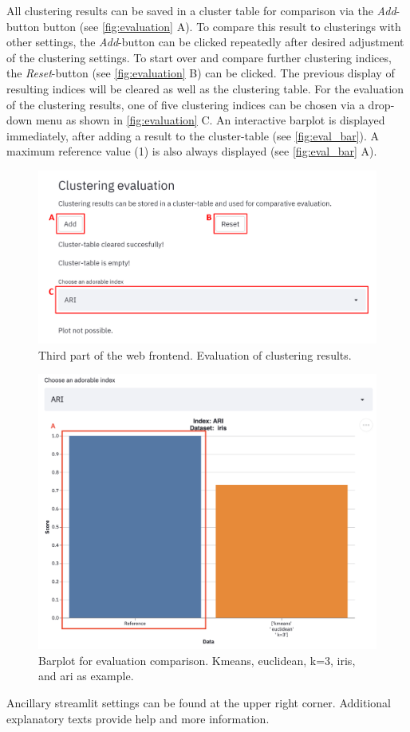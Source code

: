 All clustering results can be saved in a cluster table for comparison via the \textit{Add}-button button (see \autoref{fig:evaluation} A). To compare this result to clusterings with other settings, the \textit{Add}-button can be clicked repeatedly after desired adjustment of the clustering settings. To start over and compare further clustering indices, the \textit{Reset}-button (see \autoref{fig:evaluation} B) can be clicked. The previous display of resulting indices will be cleared as well as the clustering table.
For the evaluation of the clustering results, one of five clustering indices can be chosen via a drop-down menu as shown in \autoref{fig:evaluation} C. An interactive barplot is displayed immediately, after adding a result to the cluster-table (see \autoref{fig:eval_bar}). A maximum reference value (1) is also always displayed (see \autoref{fig:eval_bar} A).
\begin{figure}[H]
	\centering
	\includegraphics[width=\linewidth]{modules/web_frontend/evaluation_letters}
	\caption{Third part of the web frontend. Evaluation of clustering results.}\label{fig:evaluation}
\end{figure}

\begin{figure}[H]
	\centering
	\includegraphics[width=\linewidth]{report/modules/web_frontend/eval_bar.png}
	\caption{Barplot for evaluation comparison. Kmeans, euclidean, k=3, iris, and \acrshort{ari} as example.}\label{fig:eval_bar}
\end{figure}


Ancillary streamlit settings can be found at the upper right corner. Additional explanatory texts provide help and more information. \\


